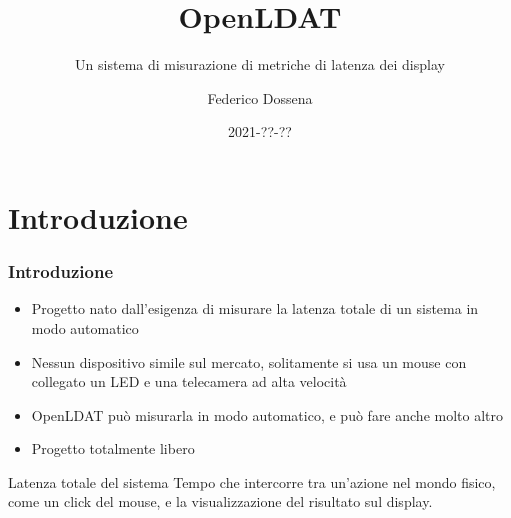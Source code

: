 \documentclass[xcolor={x11names}]{beamer}
\title{OpenLDAT}
\subtitle{Un sistema di misurazione di metriche di latenza dei display}
\author{Federico Dossena}
\institute{Università degli Studi di Milano}
\date{2021-??-??}
\begin{document}
	
\begin{frame}
	\titlepage
\end{frame}

\section{Introduzione}
\begin{frame}
	\frametitle{Introduzione}
	\begin{itemize}
		\item Progetto nato dall'esigenza di \alert{misurare la latenza totale di un sistema} in modo automatico
		\item \alert{Nessun dispositivo simile sul mercato}, solitamente si usa un mouse con collegato un LED e una telecamera ad alta velocità
		\item \alert{OpenLDAT può misurarla in modo automatico}, e può fare anche molto altro
		\item Progetto totalmente \alert{libero}
	\end{itemize}
	\begin{block}{Latenza totale del sistema}
		Tempo che intercorre tra un'azione nel mondo fisico, come un click del mouse, e la visualizzazione del risultato sul display.
	\end{block}
\end{frame}
\end{document}
